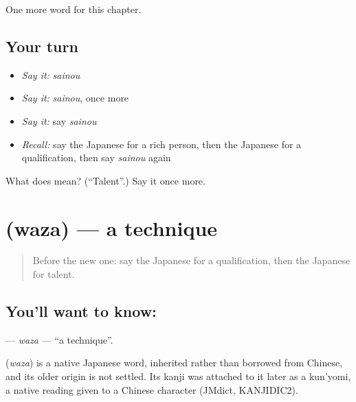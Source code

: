 \begin{grammarlens}[title={What you've built}]
One more word for this chapter.
\end{grammarlens}

\subsection*{Your turn}
\begin{itemize}
\raggedright
  \item \emph{Say it:} \emph{sainou}
  \item \emph{Say it:} \emph{sainou}, once more
  \item \emph{Say it:} say \emph{sainou}
  \item \emph{Recall:} say the Japanese for a rich person, then the Japanese for a qualification, then say \emph{sainou} again
\end{itemize}

\begin{tcolorbox}[breakable,colback=teal!4,colframe=teal!35!black,title={Before you move on}]
What does  mean? (\textquotedblleft{}Talent\textquotedblright{}.) Say it once more.
\end{tcolorbox}
\section[\texorpdfstring{\ja{わざ} (waza)}{わざ (waza)}]{ (waza) — a technique}

\label{lesson:JA-C96-waza}



\begin{quote}
Before the new one: say the Japanese for a qualification, then the Japanese for talent.
\end{quote}

\subsection*{You'll want to know: }
\textbf{} — \emph{waza} — \textquotedblleft{}a technique\textquotedblright{}.

\begin{cousinweb}
\textbf{} (\emph{waza}) is a native Japanese word, inherited rather than borrowed from Chinese, and its older origin is not settled. Its kanji was attached to it later as a kun'yomi, a native reading given to a Chinese character (JMdict, KANJIDIC2).
\end{cousinweb}

